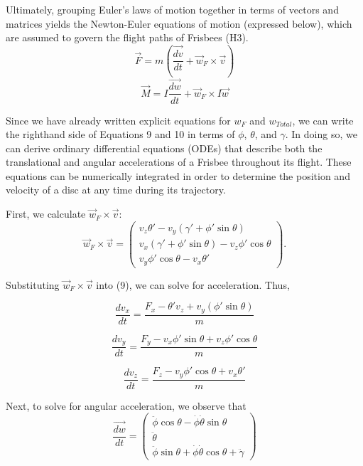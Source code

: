 \documentclass[a4paper,12pt, oneside]{article}
\begin{document}
Ultimately, grouping Euler's laws of motion together in terms of vectors and matrices yields the Newton-Euler equations of motion (expressed below), which are assumed to govern the flight paths of Frisbees (H3). 
\begin{equation}
\vec{F}=\textit{m}(\dfrac{\vec{dv}}{dt}+\vec{\textit{w}}_F\times\vec{v})
\end{equation}
\begin{equation}
\vec{M}=I\dfrac{\vec{dw}}{dt}+\vec{\textit{w}}_F\times I \vec{w}
\end{equation}

Since we have already written explicit equations for $\textit{w}_F$ and $\textit{w}_{Total}$, we can write the righthand side of Equations 9 and 10 in terms of $\phi$, $\theta$, and $\gamma$. In doing so, we can derive ordinary differential equations (ODEs) that describe both the translational and angular accelerations of a Frisbee throughout its flight. These equations can be numerically integrated in order to determine the position and velocity of a disc at any time during its trajectory. 

First, we calculate $\vec{w}_F\times\vec{v}$: 
\begin{equation*}
\vec{w}_F\times\vec{v}=\left(\begin{array}{ccc} v_z\theta'-v_y(\gamma'+\phi'\sin\theta) \\ v_x(\gamma'+\phi'\sin\theta)-v_z\phi'\cos\theta \\ v_y\phi'\cos\theta-v_x\theta'\end{array}\right).
\end{equation*}

Substituting $\vec{w}_F\times\vec{v}$ into (9), we can solve for acceleration. Thus,

\begin{equation}
\frac{{dv}_x}{dt}=\frac{{F}_x-\theta'v_z+v_y(\phi'\sin\theta)}{m}
\end{equation}

\begin{equation}
\frac{{dv}_y}{dt}=\frac{F_y-v_x\phi'\sin\theta+v_z\phi'\cos\theta}{m}
\end{equation}

\begin{equation}
\frac{{dv}_z}{dt}=\frac{F_z-v_y\phi'\cos\theta+v_x\theta'}{m}
\end{equation}

Next, to solve for angular acceleration, we observe that 
\begin{equation}
  \label{eq:dwdt}
\frac{\vec{dw}}{dt}=\left(\begin{array}{ccc}\ddot\phi\cos\theta-\dot\phi\dot\theta\sin\theta\\ \ddot\theta \\ \ddot\phi\sin\theta + \dot\phi\dot\theta\cos\theta+\ddot\gamma\end{array} \right)
\end{equation}
\end{document}
